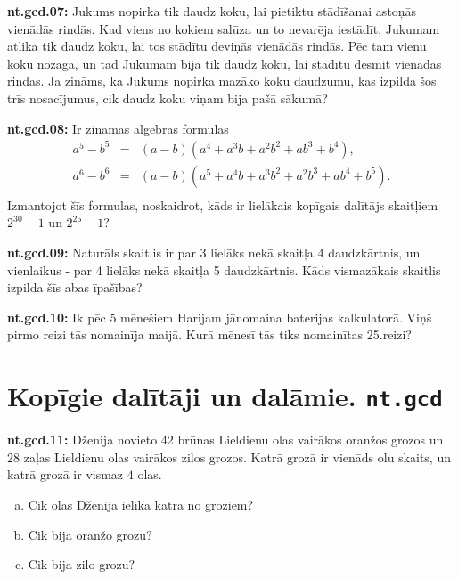 \documentclass[11pt]{article}
\newenvironment{uzdevums}[1][\unskip]{%
\vspace{3mm}
\noindent
\textbf{#1:}
\noindent}
{}
\begin{document}
\begin{uzdevums}[nt.gcd.07]
Jukums nopirka tik daudz koku, lai pietiktu stādīšanai astoņās vienādās rindās. 
Kad viens no kokiem salūza un to nevarēja iestādīt, Jukumam atlika tik daudz koku, lai 
tos stādītu deviņās vienādās rindās. Pēc tam vienu koku nozaga, un tad Jukumam bija tik daudz 
koku, lai stādītu desmit vienādas rindas. Ja zināms, ka Jukums nopirka mazāko koku daudzumu, 
kas izpilda šos trīs nosacījumus, cik daudz koku viņam bija pašā sākumā?
\end{uzdevums}

\begin{uzdevums}[nt.gcd.08]
Ir zināmas algebras formulas
\[ \begin{array}{rcl}
a^5 - b^5 & = & (a-b) \left(a^4 + a^3b + a^2b^2 + ab^3 + b^4 \right), \\ 
a^6 - b^6 & = & (a-b) \left(a^5 + a^4b + a^3b^2 + a^2b^3 + ab^4 + b^5 \right). \\ 
\end{array} \]
Izmantojot šīs formulas, noskaidrot, 
kāds ir lielākais kopīgais dalītājs skaitļiem $2^{30} - 1$ un $2^{25} - 1$? 
\end{uzdevums}

\begin{uzdevums}[nt.gcd.09]
Naturāls skaitlis ir par 3 lielāks nekā skaitļa 4 daudzkārtnis, un vienlaikus - par 4 lielāks nekā skaitļa 5 daudzkārtnis. 
Kāds vismazākais skaitlis izpilda šīs abas īpašības?
\end{uzdevums}

\begin{uzdevums}[nt.gcd.10]
Ik pēc 5 mēnešiem Harijam jānomaina baterijas kalkulatorā. 
Viņš pirmo reizi tās nomainīja maijā. Kurā mēnesī tās tiks nomainītas 25.reizi?
\end{uzdevums}





\section{Kopīgie dalītāji un dalāmie. \texttt{nt.gcd}}

\begin{uzdevums}[nt.gcd.11]
Dženija novieto 42 brūnas Lieldienu olas vairākos oranžos grozos un 
$28$ zaļas Lieldienu olas vairākos zilos grozos. Katrā grozā ir vienāds olu skaits, un katrā grozā ir 
vismaz $4$ olas. 
\begin{enumerate}[(a)]
\item Cik olas Dženija ielika katrā no groziem?
\item Cik bija oranžo grozu?
\item Cik bija zilo grozu?
\end{enumerate}
\end{uzdevums}
\end{document}

